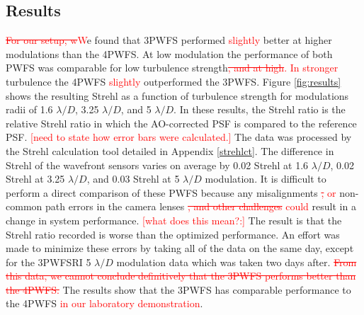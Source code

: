 \documentclass[12pt]{spieman}  %
\newcommand{\jrmadd}[1]{\textcolor{red}{#1}}
\newcommand{\jrmrmv}[1]{\textcolor{red}{\sout{#1}}}
\newcommand{\jrmcom}[1]{\textcolor{red}{[#1]}}
\begin{document}
\begin{spacing}{2}

 





\section{Results}
\jrmrmv{For our setup, w}\jrmadd{W}e found that 3PWFS performed \jrmadd{slightly} better at higher modulations than the 4PWFS. At low modulation the performance of both PWFS was comparable for low turbulence strength\jrmrmv{, and at high}\jrmadd{. In stronger} turbulence the 4PWFS \jrmadd{slightly} outperformed the 3PWFS. Figure \ref{fig:results} shows the resulting Strehl as a function of turbulence strength for modulations radii of 1.6 $\lambda/D$, 3.25 $\lambda/D$, and 5 $\lambda/D$. In these results, the Strehl ratio is the relative Strehl ratio in which the AO-corrected PSF is compared to the reference PSF. \jrmcom{need to state how error bars were calculated.} The data was processed by the Strehl calculation tool detailed in Appendix \ref{strehlct}. The difference in Strehl of the wavefront sensors varies on average by 0.02 Strehl at 1.6 $\lambda/D$, 0.02 Strehl at 3.25 $\lambda/D$, and 0.03 Strehl at 5 $\lambda/D$ modulation. It is difficult to perform a direct comparison of these PWFS because any misalignments \jrmrmv{,} \jrmadd{or} non-common path errors in the camera lenses \jrmrmv{, and other challenges} \jrmadd{could} result in a change in system performance. \jrmcom{what does this mean?:} The result is that the Strehl ratio recorded is worse than the optimized performance. An effort was made to minimize these errors by taking all of the data on the same day, except for the 3PWFSRI 5 $\lambda/D$ modulation data which was taken two days after. \jrmrmv{From this data, we cannot conclude definitively that the 3PWFS performs better than the 4PWFS.} The results show that the 3PWFS has comparable performance to the 4PWFS \jrmadd{in our laboratory demonstration}. 



\end{spacing}
\end{document}
